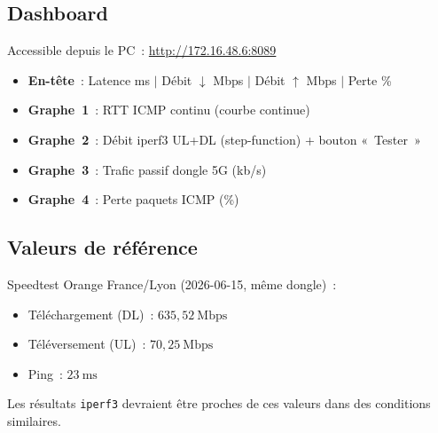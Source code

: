 \documentclass[a4paper,12pt]{article}
\begin{document}
\subsection{Dashboard}

Accessible depuis le PC~: \href{http://172.16.48.6:8089}{http://172.16.48.6:8089}

\begin{itemize}
  \item \textbf{En-tête}~: Latence ms $|$ Débit $\downarrow$ Mbps $|$ Débit $\uparrow$ Mbps $|$ Perte \%
  \item \textbf{Graphe~1}~: RTT ICMP continu (courbe continue)
  \item \textbf{Graphe~2}~: Débit iperf3 UL+DL (step-function) + bouton «~Tester~»
  \item \textbf{Graphe~3}~: Trafic passif dongle 5G (kb/s)
  \item \textbf{Graphe~4}~: Perte paquets ICMP (\%)
\end{itemize}

\subsection{Valeurs de référence}

Speedtest Orange France/Lyon (2026-06-15, même dongle)~:
\begin{itemize}
  \item Téléchargement (DL)~: $635{,}52\ \text{Mbps}$
  \item Téléversement (UL)~: $70{,}25\ \text{Mbps}$
  \item Ping~: $23\ \text{ms}$
\end{itemize}

Les résultats \texttt{iperf3} devraient être proches de ces valeurs dans des conditions
similaires.
\end{document}
